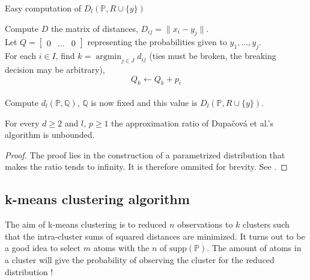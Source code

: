 \documentclass{amsart}
\newcommand{\argmin}{\mathop{\arg\min}}
\begin{document}
\begin{algorithm}
    \caption{Easy computation of $D_l\left(\mathbb{P},R\cup \{y\}\right)$}\label{easy compute of d_l}
    Compute $D$ the matrix of distances, $D_{ij}=\lVert x_i-y_j\rVert$. \\
    Let $Q=\begin{bmatrix}
        0 & \hdots &0
    \end{bmatrix}$ representing the probabilities given to $y_1,...,y_j.$ \\
    For each $i\in I$, find $k=\argmin_{j\in J}d_{ij}$ (ties must be broken, the breaking decision may be arbitrary), $$
    Q_{k}\gets Q_{k}+p_i$$ \\ Compute $d_l\left(\mathbb{P},\mathbb{Q}\right)$, $\mathbb{Q}$ is now fixed and this value is $D_l\left(\mathbb{P}, R\cup\{y\}\right).$
\end{algorithm}
\begin{proposition}
    For every $d\geq2$ and $l$, $p\geq1$ the approximation ratio of Dupačová et al.'s algorithm is unbounded.
\end{proposition}
\begin{proof}
    The proof lies in the construction of a parametrized distribution that makes the ratio tends to infinity. It is therefore ommited for brevity. See \cite[Theorem 7]{rujeerapaiboon_scenario_2022}.
\end{proof}

\subsection{k-means clustering algorithm}
The aim of k-means clustering is to reduced $n$ observations to $k$ clusters such that the intra-cluster sums of squared distances are minimized. It turns out to be a good idea to select $m$ atoms with the $n$ of $\text{supp}\left(\mathbb{P}\right)$. The amount of atoms in a cluster will give the probability of observing the cluster for the reduced distribution !
\end{document}
